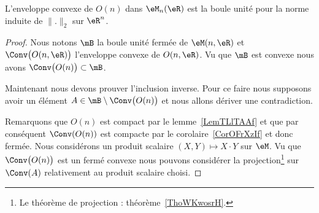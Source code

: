 \begin{theorem} \label{ThoVBzqUpy}
	L'enveloppe convexe de \( O(n)\) dans \( \eM_n(\eR)\) est la boule unité pour la norme induite de \( \| . \|_2\) sur \( \eR^n\).
\end{theorem}

\begin{proof}
	Nous notons \( \mB\) la boule unité fermée de \( \eM(n,\eR)\) et \( \Conv\big( O(n,\eR) \big)\) l'enveloppe convexe de \( O(n,\eR)\). Vu que \( \mB\) est convexe nous avons \( \Conv\big( O(n) \big)\subset\mB\).


	Maintenant nous devons prouver l'inclusion inverse. Pour ce faire nous supposons avoir un élément \( A\in \mB\setminus\Conv\big( O(n) \big)\) et nous allons dériver une contradiction.

	Remarquons que \( O(n)\) est compact par le lemme~\ref{LemTLlTAAf} et que par conséquent \( \Conv(O(n))\) est compacte par le corolaire~\ref{CorOFrXzIf} et donc fermée. Nous considérons un produit scalaire \( (X,Y)\mapsto X\cdot Y\) sur \( \eM\). Vu que \( \Conv\big( O(n) \big)\) est un fermé convexe nous pouvons considérer la projection\footnote{Le théorème de projection : théorème~\ref{ThoWKwosrH}.} sur \( \Conv(A)\) relativement au produit scalaire choisi.


\end{proof}
